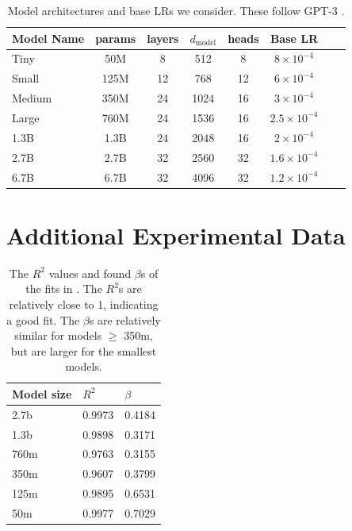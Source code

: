 \begin{table}[h]
    \vspace{-0.3cm}
    \begin{center}
        \begin{tabular}{l c c c c c c c}
        \toprule
        Model Name & params & layers & $d_{\mathrm{model}}$ & heads & Base LR \\
        \midrule
Tiny & 50M & 8 & 512 & 8 &  $8 \times 10^{-4}$ \\  
Small & 125M & 12 & 768 & 12 &  $6 \times 10^{-4}$ \\                         
Medium & 350M & 24 & 1024 & 16 & $3 \times 10^{-4}$ \\                        
Large & 760M & 24 & 1536 & 16 &  $2.5 \times 10^{-4}$ \\                       
1.3B & 1.3B & 24 & 2048 & 16 &  $2 \times 10^{-4}$ \\                            
2.7B   & 2.7B & 32 & 2560 & 32 & $1.6 \times 10^{-4}$ \\                       
6.7B   & 6.7B & 32 & 4096 & 32  & $1.2 \times 10^{-4}$ \\                  
        \bottomrule
        \end{tabular}
    \end{center}
    \vspace{-0.3cm}
    \caption{Model architectures and base LRs we consider. These follow GPT-3 \cite{brown2020language}.}
    \label{table:param}
\end{table}



\FloatBarrier
\newpage
\section{Additional Experimental Data}
\label{appendix:experimental_data}


\begin{table}[h]
\begin{center}
\begin{tabular}{lll}
\toprule
Model size & $R^2$  & $\beta$   \\
\midrule
2.7b    & 0.9973 &  0.4184 \\
1.3b  & 0.9898 &  0.3171  \\
760m  & 0.9763 &  0.3155  \\
350m  & 0.9607 &  0.3799  \\
125m  & 0.9895 &  0.6531  \\
50m   & 0.9977 &  0.7029  \\
\bottomrule
\end{tabular}
\end{center}
\caption{The $R^2$ values and found $\beta$s of the fits in . The $R^2$s are relatively close to 1, indicating a good fit. The $\beta$s are relatively similar for models $\ge$ 350m, but are larger for the smallest models.}
\label{table:r2_scaling}
\end{table}


